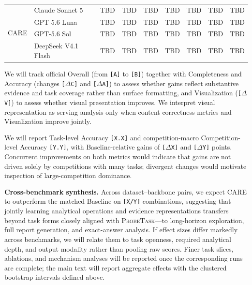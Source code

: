 \documentclass{article}
\newcommand{\method}{\textsc{CARE}}
\newcommand{\probe}{\textsc{ProbeTask}}
\begin{document}
\begin{table}[t]
\begin{tabular}{llrrrrrrr}
    \midrule
    \multirow{6}{*}{\method{}}
      & Claude Sonnet 5 & TBD & TBD & TBD & TBD & TBD & TBD & TBD \\
      & GPT-5.6 Luna & TBD & TBD & TBD & TBD & TBD & TBD & TBD \\
      & GPT-5.6 Sol & TBD & TBD & TBD & TBD & TBD & TBD & TBD \\
      & DeepSeek V4.1 Flash & TBD & TBD & TBD & TBD & TBD & TBD & TBD \\
    \bottomrule
  \end{tabular}
\end{table}

We will track official Overall (from \texttt{[A]} to \texttt{[B]}) together with Completeness and Accuracy (changes \texttt{[$\Delta$C]} and \texttt{[$\Delta$A]}) to assess whether gains reflect substantive evidence and task coverage rather than surface formatting, and Visualization (\texttt{[$\Delta$V]}) to assess whether visual presentation improves.
We interpret visual representation as serving analysis only when content-correctness metrics and Visualization improve jointly.

We will report Task-level Accuracy \texttt{[X.X]} and competition-macro Competition-level Accuracy \texttt{[Y.Y]}, with Baseline-relative gains of \texttt{[$\Delta$X]} and \texttt{[$\Delta$Y]} points.
Concurrent improvements on both metrics would indicate that gains are not driven solely by competitions with many tasks; divergent changes would motivate inspection of large-competition dominance.

\noindent\textbf{Cross-benchmark synthesis.}
Across dataset--backbone pairs, we expect \method{} to outperform the matched Baseline on \texttt{[X/Y]} combinations, suggesting that jointly learning analytical operations and evidence representations transfers beyond task forms closely aligned with \probe{}---to long-horizon exploration, full report generation, and exact-answer analysis.
If effect sizes differ markedly across benchmarks, we will relate them to task openness, required analytical depth, and output modality rather than pooling raw scores.
Finer task slices, ablations, and mechanism analyses will be reported once the corresponding runs are complete; the main text will report aggregate effects with the clustered bootstrap intervals defined above.
\end{document}
